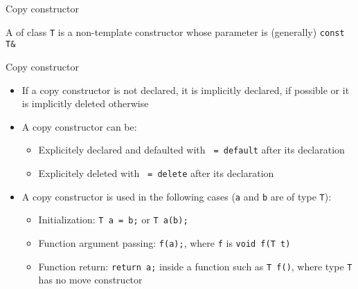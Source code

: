 \begin{frame}{Copy constructor}{}
  \begin{definition}
    A  of class \lstinline!T! is a non-template constructor whose parameter is (generally) \lstinline!const T&!
  \end{definition}

  \begin{block}{Copy constructor}
    \begin{itemize}
    \item
      If a copy constructor is not declared, it is implicitly declared, if possible or it is implicitly deleted otherwise
    \item
      A copy constructor can be:
      \begin{itemize}
      \item
        Explicitely declared and defaulted with \lstinline! = default! after its declaration
      \item
        Explicitely deleted with \lstinline! = delete! after its declaration
      \end{itemize}
    \item
      A copy constructor is used in the following cases (\lstinline!a! and \lstinline!b! are of type \lstinline!T!):
      \begin{itemize}
      \item
        Initialization: \lstinline!T a = b;! or \lstinline!T a(b);!
      \item
        Function argument passing: \lstinline!f(a);!, where \lstinline!f! is \lstinline!void f(T t)!
      \item
        Function return: \lstinline!return a;! inside a function such as \lstinline!T f()!, where type \lstinline!T! has no move constructor
      \end{itemize}
    \end{itemize}
  \end{block}
\end{frame}

